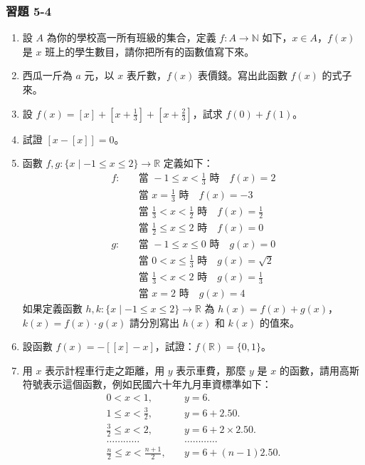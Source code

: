 \subsubsection*{習題 5-4}\label{sec:ex5-4}

\begin{enumerate}[1.]
  \item 設 $A$ 為你的學校高一所有班級的集合，定義 $f: A \longrightarrow \mathbb{N}$ 如下，$x \in A$，$f(x)$ 是 $x$ 班上的學生數目，請你把所有的函數值寫下來。
  \item 西瓜一斤為 $a$ 元，以 $x$ 表斤數，$f(x)$ 表價錢。寫出此函數 $f(x)$ 的式子來。
  \item 設 $f(x)=[x]+\left[x+\frac{1}{3}\right]+\left[x+\frac{2}{3}\right]$，試求 $f(0)+f(1)$。
  \item 試證 $[x-[x]]=0$。
  \item 函數 $f, g: \{x \mid -1 \le x \le 2\} \longrightarrow \mathbb{R}$ 定義如下：
  \begin{align*}
    f: \quad &\text{當 } -1 \le x < \frac{1}{3} \text{ 時} \quad f(x)=2 \\
    &\text{當 } x = \frac{1}{3} \text{ 時} \quad f(x)=-3 \\
    &\text{當 } \frac{1}{3} < x < \frac{1}{2} \text{ 時} \quad f(x)=\frac{1}{2} \\
    &\text{當 } \frac{1}{2} \le x \le 2 \text{ 時} \quad f(x)=0 \\
    g: \quad &\text{當 } -1 \le x \le 0 \text{ 時} \quad g(x)=0 \\
    &\text{當 } 0 < x \le \frac{1}{3} \text{ 時} \quad g(x)=\sqrt{2} \\
    &\text{當 } \frac{1}{3} < x < 2 \text{ 時} \quad g(x)=\frac{1}{3} \\
    &\text{當 } x = 2 \text{ 時} \quad g(x)=4
  \end{align*}
  如果定義函數 $h, k: \{x \mid -1 \le x \le 2\} \longrightarrow \mathbb{R}$ 為 $h(x)=f(x)+g(x)$，$k(x)=f(x) \cdot g(x)$ 請分別寫出 $h(x)$ 和 $k(x)$ 的值來。
  \item 設函數 $f(x)=-[[x]-x]$，試證：$f(\mathbb{R})=\{0, 1\}$。
  \item 用 $x$ 表示計程車行走之距離，用 $y$ 表示車費，那麼 $y$ 是 $x$ 的函數，請用高斯符號表示這個函數，例如民國六十年九月車資標準如下：
  \begin{align*}
    0 < x < 1, \quad & y = 6. \\
    1 \le x < \frac{3}{2}, \quad & y = 6+2.50. \\
    \frac{3}{2} \le x < 2, \quad & y = 6+2 \times 2.50. \\
    \dots\dots\dots\dots & \dots\dots\dots\dots \\
    \frac{n}{2} \le x < \frac{n+1}{2}, \quad & y = 6+(n-1)2.50.
  \end{align*}
\end{enumerate}


